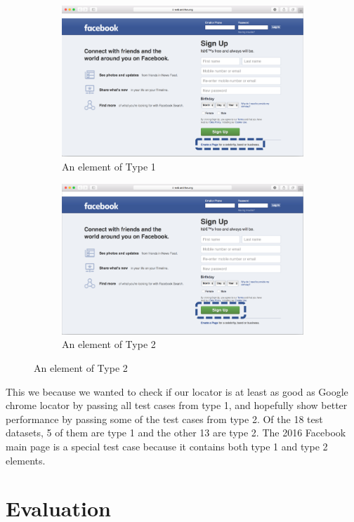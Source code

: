 \documentclass[format=acmlarge, nonacm=true]{acmart}
\begin{document}
\begin{figure}
	\centering
	\label{fig:test}
	\caption{A webpage with both type 1 and type 2 element}
	\begin{subfigure}{.5\textwidth}
		\centering
		\includegraphics[width=0.8\linewidth]{images/FB1.png}
		\caption{An element of Type 1}
		\label{fig:sub1}
	\end{subfigure}%
	\begin{subfigure}{.5\textwidth}
		\centering
		\includegraphics[width=.8\linewidth]{images/FB2.png}
		\caption{An element of Type 2}
		\label{fig:sub2}
	\end{subfigure}
\end{figure}

This we because we wanted to check if our locator is at least as good as Google chrome locator by passing all test cases from type 1, and hopefully show better performance by passing some of the test cases from type 2. Of the 18 test datasets, 5 of them are type 1 and the other 13 are type 2. The 2016 Facebook main page is a special test case because it contains both type 1 and type 2 elements. 


\section{Evaluation}
\end{document}
